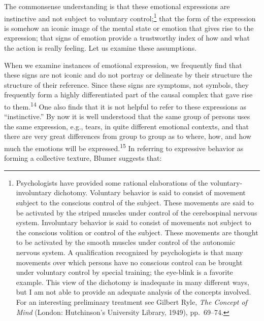 \documentclass[twoside,symmetric,nobib,justified]{tufte-book}
\begin{document}
\noindent The commonsense understanding is that these emotional expressions are
instinctive and not subject to voluntary control;\footnote{Psychologists
  have provided some rational elaborations of the voluntary-involuntary
  dichotomy. Voluntary behavior is said to consist of movement subject
  to the conscious control of the subject. These movements are said to
  be activated by the striped muscles under control of the cerebospinal
  nervous system. Involuntary behavior is said to consist of movements
  not subject to the conscious volition or control of the subject. These
  movements are thought to be activated by the smooth muscles under
  control of the autonomic nervous system. A qualification recognized by
  psychologists is that many movements over which persons have no
  conscious control can be brought under voluntary control by special
  training; the eye-blink is a favorite example. This view of the
  dichotomy is inadequate in many different ways, but I am not able to
  provide an adequate analysis of the concepts involved. For an
  interesting preliminary treatment see Gilbert Ryle, \emph{The Concept
  of Mind} (London: Hutchinson's University Library, 1949), pp.~69--74.}
that the form of the expression is somehow an iconic image of the mental
state or emotion that gives rise to the expression; that signs of
emotion provide a trustworthy index of how and what the action is really
feeling. Let us examine these assumptions.

When we examine instances of emotional expression, we frequently find
that these signs are not iconic and do not portray or delineate by their
structure the structure of their reference. Since these signs are
symptoms, not symbols, they frequently form a highly differentiated part
of the causal complex that gave rise to them.\textsuperscript{14} One also
finds that it is not helpful to refer to these expressions as
``instinctive.'' By now it is well understood that the same group of
persons uses the same expression, e.g., tears, in quite different
emotional contexts, and that there are very great differences from group
to group as to where, how, and how much the emotions will be
expressed.\textsuperscript{15} In referring to
expressive behavior as forming a collective texture, Blumer suggests
that:
\end{document}
